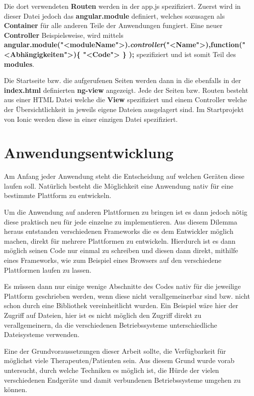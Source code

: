 Die dort verwendeten \textbf{Routen} werden in der app.js spezifiziert. Zuerst wird in dieser Datei jedoch das \textbf{angular.module} definiert, welches sozusagen als \textbf{Container} für alle anderen Teile der Anwendungen fungiert. Eine neuer \textbf{Controller} Beispielsweise, wird mittels \\ \textbf{angular.module("<moduleName">).\textit{controller}("<Name">),function("<Abhängigkeiten">)\{ "<Code"> \} );} spezifiziert und ist somit Teil des \textbf{modules}.

Die Startseite bzw. die aufgerufenen Seiten werden dann in die ebenfalls in der \textbf{index.html} definierten \textbf{ng-view} angezeigt. Jede der Seiten bzw. Routen besteht aus einer HTML Datei welche die \textbf{View} spezifiziert und einem Controller welche der Übersichtlichkeit in jeweils eigene Dateien ausgelagert sind. Im Startprojekt von Ionic \cite{IONIC16} werden diese in einer einzigen Datei spezifiziert.

\section{Anwendungsentwicklung}\label{Anwendungsentwicklung}
Am Anfang jeder Anwendung steht die Entscheidung auf welchen Geräten diese laufen soll. Natürlich besteht die Möglichkeit eine Anwendung nativ für eine bestimmte Plattform zu entwickeln.

Um die Anwendung auf anderen Plattformen zu bringen ist es dann jedoch nötig diese praktisch neu für jede einzelne zu implementieren. Aus diesem Dilemma heraus entstanden verschiedenen Frameworks die es dem Entwickler möglich machen, direkt für mehrere Plattformen zu entwickeln. Hierdurch ist es dann möglich seinen Code nur einmal zu schreiben und diesen dann direkt, mithilfe eines Frameworks, wie zum Beispiel eines Browsers auf den verschiedene Plattformen laufen zu lassen.

Es müssen dann nur einige wenige Abschnitte des Codes nativ für die jeweilige Plattform geschrieben werden, wenn diese nicht verallgemeinerbar sind bzw. nicht schon durch eine Bibliothek vereinheitlicht wurden. Ein Beispiel wäre hier der Zugriff auf Dateien, hier ist es nicht möglich den Zugriff direkt zu verallgemeinern, da die verschiedenen Betriebssysteme unterschiedliche Dateisysteme verwenden.

Eine der Grundvoraussetzungen dieser Arbeit sollte, die Verfügbarkeit für möglichst viele Therapeuten/Patienten sein. Aus diesem Grund wurde vorab untersucht, durch welche Techniken es möglich ist, die Hürde der vielen verschiedenen Endgeräte und damit verbundenen Betriebssysteme umgehen zu können. 


